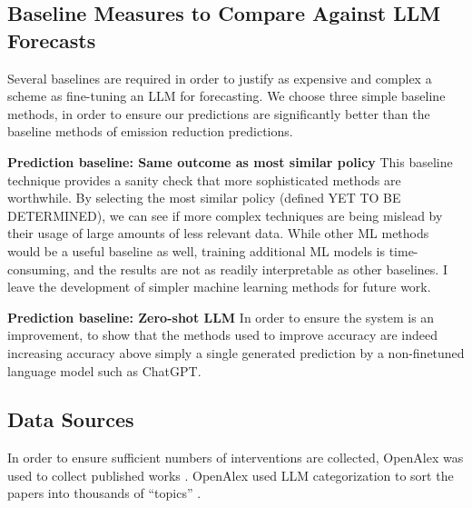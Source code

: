 \documentclass[12pt,a4paper]{article}
\begin{document}
\subsection{Baseline Measures to Compare Against LLM Forecasts}
Several baselines are required in order to justify as expensive and complex a scheme as fine-tuning an LLM for forecasting. We choose three simple baseline methods, in order to ensure our predictions are significantly better than the baseline methods of emission reduction predictions.

\textbf{Prediction baseline: Same outcome as most similar policy}
This baseline technique provides a sanity check that more sophisticated methods are worthwhile. By selecting the most similar policy (defined YET TO BE DETERMINED), we can see if more complex techniques are being mislead by their usage of large amounts of less relevant data. While other ML methods would be a useful baseline as well, training additional ML models is time-consuming, and the results are not as readily interpretable as other baselines. I leave the development of simpler machine learning methods for future work.



\textbf{Prediction baseline: Zero-shot LLM}
In order to ensure the system is an improvement, to show that the methods used to improve accuracy are indeed increasing accuracy above simply a single generated prediction by a non-finetuned language model such as ChatGPT.


\subsection{Data Sources} \label{sec:methods_for_llm_forecasting}
In order to ensure sufficient numbers of interventions are collected, OpenAlex was used to collect published works . OpenAlex used LLM categorization to sort the papers into thousands of ``topics'' .
\end{document}
